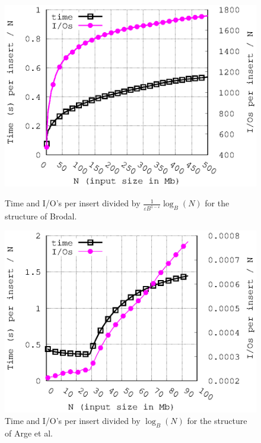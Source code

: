 \documentclass[twoside,11pt,openright]{report}
\def \epsilon {\varepsilon}
\begin{document}
\begin{figure}
\centering
\begin{minipage}{0.48\columnwidth}
  \centering
  \includegraphics[width=\linewidth]{../src/experiments/insert_experiment_results/2016-05-22.16_20_22/time_and_ios}%
  \caption{Time and I/O's per insert divided by $\frac{1}{\epsilon B^{1-\epsilon}}\log_B(N)$ for the structure of Brodal.}
  \label{fig:time_divided_with_asymptotic_brodal}
\end{minipage}%
\hfill
\begin{minipage}{0.48\columnwidth}
  \centering
  \includegraphics[width=\linewidth]{../src/experiments/insert_experiment_results/2016-05-25.10_23_00/time_and_ios}%
  \caption{Time and I/O's per insert divided by $\log_B(N)$ for the structure of Arge et al.}
  \label{fig:time_divided_with_asymptotic_arge}
\end{minipage}


\end{figure}
\end{document}
